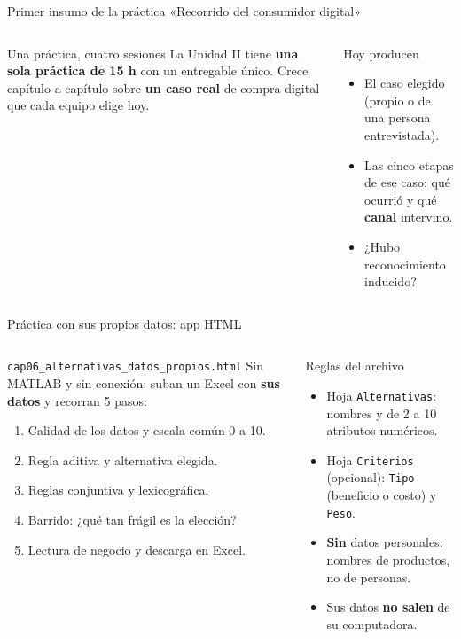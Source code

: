 \documentclass[aspectratio=169,xcolor=dvipsnames]{beamer}
\begin{document}
\begin{frame}{Primer insumo de la práctica «Recorrido del consumidor digital»}
\begin{columns}[T]
  \begin{block}{Una práctica, cuatro sesiones}
    \small La Unidad II tiene \textbf{una sola práctica de 15 h} con un entregable único. Crece capítulo a capítulo sobre \textbf{un caso real} de compra digital que cada equipo elige hoy.
  \end{block}
  \begin{exampleblock}{Hoy producen}
    \scriptsize
    \begin{itemize}
      \item El caso elegido (propio o de una persona entrevistada).
      \item Las cinco etapas de ese caso: qué ocurrió y qué \textbf{canal} intervino.
      \item ¿Hubo reconocimiento inducido?
    \end{itemize}
  \end{exampleblock}
\end{columns}
\end{frame}

\begin{frame}{Práctica con sus propios datos: app HTML}
\begin{columns}[T]
  \begin{block}{\texttt{cap06\_alternativas\_datos\_propios.html}}
    \small Sin MATLAB y sin conexión: suban un Excel con \textbf{sus datos} y recorran 5 pasos:
    \scriptsize
    \begin{enumerate}
      \item Calidad de los datos y escala común 0 a 10.
      \item Regla aditiva y alternativa elegida.
      \item Reglas conjuntiva y lexicográfica.
      \item Barrido: ¿qué tan frágil es la elección?
      \item Lectura de negocio y descarga en Excel.
    \end{enumerate}
  \end{block}
  \begin{exampleblock}{Reglas del archivo}
    \scriptsize
    \begin{itemize}
      \item Hoja \texttt{Alternativas}: nombres y de 2 a 10 atributos numéricos.
      \item Hoja \texttt{Criterios} (opcional): \texttt{Tipo} (beneficio o costo) y \texttt{Peso}.
      \item \textbf{Sin} datos personales: nombres de productos, no de personas.
      \item Sus datos \textbf{no salen} de su computadora.
    \end{itemize}
  \end{exampleblock}
\end{columns}
\end{frame}
\end{document}
